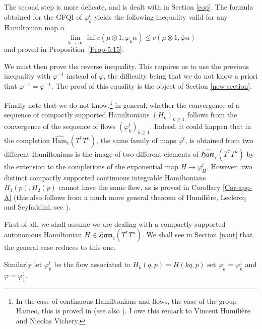 \documentclass[JEP,XML,SOM,NoFloatCountersInSection,Unicode,published]{cedram}
\numberwithin{equation}{section}
\newcommand {\Ham}{{\mathfrak {Ham}}}
\newcommand {\DHam}{\mathrm{Ham}}
\newcommand{\gclHamc}[1]{\widehat{\Ham}_c(#1)}
\newcommand{\gclDHamc}[1]{\widehat{\DHam}_c(#1)}
\newcommand{\GFQI}{\textup{GFQI}\xspace}
\let \phi \varphi
\theoremstyle{plain}
\theoremstyle{definition}
\theoremstyle{remark}
\begin{document}
The second step is more delicate, and is dealt with in Section \ref{eop}. The formula obtained for the \GFQI of $\phi_{k}^{t}$ yields the following inequality valid for any Hamiltonian map $\alpha$
\[
\lim_{k \to \infty}\inf c (\mu\otimes 1, \varphi_{k} \alpha) \leq c (\mu\otimes 1,\overline\varphi
\alpha)
\]
and proved in Proposition~\ref{Prop-5.15}.

We must then prove the reverse inequality. This requires us to use the previous inequality with $\varphi^{-1}$ instead of $\varphi$, the difficulty being that we do not know a priori that $\overline{\varphi^{-1}}=\overline \varphi^{-1}$. The proof of this equality is the object of Section \ref{new-section}.

Finally note that we do not know,\footnote{In the case of continuous Hamiltonians and flows, \ie the case of the group $\mathrm{Hameo}$, this is proved in \cite{Viterbo-unique} (see also \cite{B-S}). I owe this remark to Vincent Humilière and Nicolas Vichery.} in general, whether the convergence of a sequence of compactly supported Hamiltonians $(H_{k})_{k \geq 1}$ follows from the convergence of
the sequence of flows $(\varphi_{k}^t)_{k\geq 1}$. Indeed, it could happen that in the completion $\gclDHamc{ T^*T^n}$, the same family of maps $\overline\varphi^t$, is obtained from two different Hamiltonians \ie is the image of two different elements of $\gclHamc{T^*T^n}$ by the extension to the completions of the exponential map $H \to \varphi_{H}^t$. However, two distinct compactly supported continuous integrable Hamiltonians $H_{1}(p), H_{2}(p)$ cannot have the same flow, as is proved in Corollary \ref{Cor-app-A} (this also follows from a much more general theorem of Humilière, Leclercq and Seyfaddini, see \cite{H-L-S}).

 \label{subsec:reform}

First of all, we shall assume we are dealing with a compactly supported autonomous
Hamiltonian $H\in \Ham_c (T^*T^n)$. We shall see in Section \ref{naut} that the general case
reduces to this one.

Similarly let $\varphi^{t}_{k}$ be the flow associated to $H_{k}(q,p)=
H(kq,p)$ set $\varphi_{k} = \varphi_{k}^{1}$ and $\varphi=\varphi_1^1$.
\end{document}
